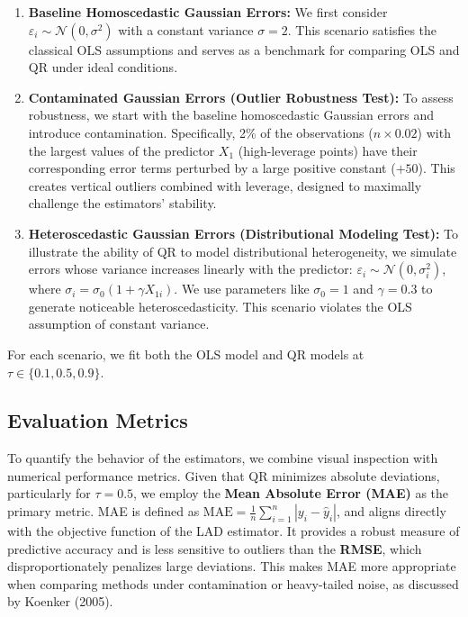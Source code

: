 \documentclass[fleqn,10pt]{latex/stylish_article} %
\begin{document}
\begin{enumerate}
\def\labelenumi{\arabic{enumi}.}
\item
  \textbf{Baseline Homoscedastic Gaussian Errors:} We first consider \(\varepsilon_i \sim \mathcal{N}(0, \sigma^2)\) with a constant variance \(\sigma = 2\). This scenario satisfies the classical OLS assumptions and serves as a benchmark for comparing OLS and QR under ideal conditions.
\item
  \textbf{Contaminated Gaussian Errors (Outlier Robustness Test):} To assess robustness, we start with the baseline homoscedastic Gaussian errors and introduce contamination. Specifically, 2\% of the observations (\(n \times 0.02\)) with the largest values of the predictor \(X_1\) (high-leverage points) have their corresponding error terms perturbed by a large positive constant (\(+50\)). This creates vertical outliers combined with leverage, designed to maximally challenge the estimators' stability.
\item
  \textbf{Heteroscedastic Gaussian Errors (Distributional Modeling Test):} To illustrate the ability of QR to model distributional heterogeneity, we simulate errors whose variance increases linearly with the predictor: \(\varepsilon_i \sim \mathcal{N}(0, \sigma_i^2)\), where \(\sigma_i = \sigma_0 (1 + \gamma X_{1i})\). We use parameters like \(\sigma_0 = 1\) and \(\gamma = 0.3\) to generate noticeable heteroscedasticity. This scenario violates the OLS assumption of constant variance.
\end{enumerate}

For each scenario, we fit both the OLS model and QR models at \(\tau \in \{0.1, 0.5, 0.9\}\).

\subsection{Evaluation Metrics}\label{evaluation-metrics}

To quantify the behavior of the estimators, we combine visual inspection with numerical performance metrics. Given that QR minimizes absolute deviations, particularly for \(\tau = 0.5\), we employ the \textbf{Mean Absolute Error (MAE)} as the primary metric. MAE is defined as \(\text{MAE} = \frac{1}{n} \sum_{i=1}^n |y_i - \hat{y}_i|\), and aligns directly with the objective function of the LAD estimator. It provides a robust measure of predictive accuracy and is less sensitive to outliers than the \textbf{RMSE}, which disproportionately penalizes large deviations. This makes MAE more appropriate when comparing methods under contamination or heavy-tailed noise, as discussed by Koenker (2005).
\end{document}
